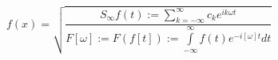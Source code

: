 \documentclass{scrartcl}
\begin{document}
\begin{equation}
f(x)=\sqrt{\frac{S_\infty f(t):=\sum\limits_{k=-\infty}^{\infty} c_k e^{ik\omega t}}{F[\omega]:= F(f[t]):= \int \limits_{-\infty}^\infty f(t) e^{-i[\omega] t}dt}}
\end{equation}
\end{document}
